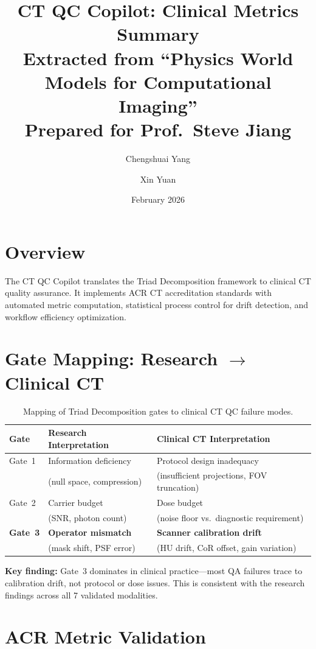 \documentclass[11pt]{article}
\title{\textbf{CT QC Copilot: Clinical Metrics Summary}\\[4pt]
\large Extracted from ``Physics World Models for Computational Imaging''\\
Prepared for Prof.\ Steve Jiang}
\author{Chengshuai Yang \and Xin Yuan}
\date{February 2026}
\begin{document}
\maketitle
\thispagestyle{empty}

\section*{Overview}

The CT QC Copilot translates the Triad Decomposition framework to clinical CT quality assurance. It implements ACR CT accreditation standards with automated metric computation, statistical process control for drift detection, and workflow efficiency optimization.

\section{Gate Mapping: Research $\to$ Clinical CT}

\begin{table}[htbp]
\centering
\caption{Mapping of Triad Decomposition gates to clinical CT QC failure modes.}
\begin{tabular}{lll}
\toprule
\textbf{Gate} & \textbf{Research Interpretation} & \textbf{Clinical CT Interpretation} \\
\midrule
Gate~1 & Information deficiency       & Protocol design inadequacy \\
       & (null space, compression)     & (insufficient projections, FOV truncation) \\
\midrule
Gate~2 & Carrier budget               & Dose budget \\
       & (SNR, photon count)          & (noise floor vs.\ diagnostic requirement) \\
\midrule
\textbf{Gate~3} & \textbf{Operator mismatch}    & \textbf{Scanner calibration drift} \\
       & (mask shift, PSF error)      & (HU drift, CoR offset, gain variation) \\
\bottomrule
\end{tabular}
\end{table}

\noindent\textbf{Key finding:} Gate~3 dominates in clinical practice---most QA failures trace to calibration drift, not protocol or dose issues.  This is consistent with the research findings across all 7 validated modalities.

\section{ACR Metric Validation}
\end{document}
